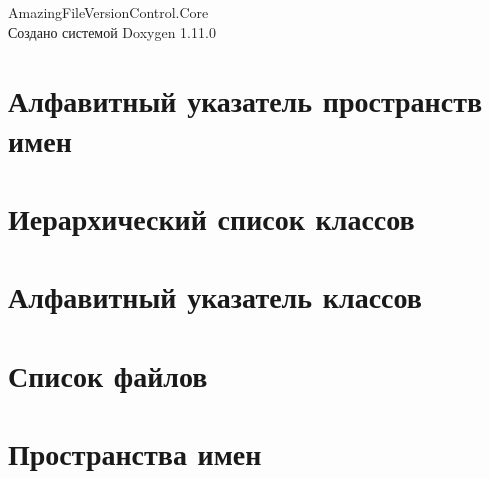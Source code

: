\documentclass[twoside]{book}
\newcommand{\+}{\discretionary{\mbox{\scriptsize$\hookleftarrow$}}{}{}}
\newcommand{\clearemptydoublepage}{%
    \newpage{\pagestyle{empty}\cleardoublepage}%
  }
\begin{document}
  \raggedbottom
    \hypersetup{pageanchor=false,
                bookmarksnumbered=true,
                pdfencoding=unicode
               }
  \begin{titlepage}
  \vspace*{7cm}
  \begin{center}%
  {\Large Amazing\+File\+Version\+Control.\+Core}\\
  \vspace*{1cm}
  {\large Создано системой Doxygen 1.11.0}\\
  \end{center}
  \end{titlepage}
  \clearemptydoublepage
  \tableofcontents
  \clearemptydoublepage
  \hypersetup{pageanchor=true}
\chapter{Алфавитный указатель пространств имен}

\chapter{Иерархический список классов}

\chapter{Алфавитный указатель классов}

\chapter{Список файлов}

\chapter{Пространства имен}














\end{document}
